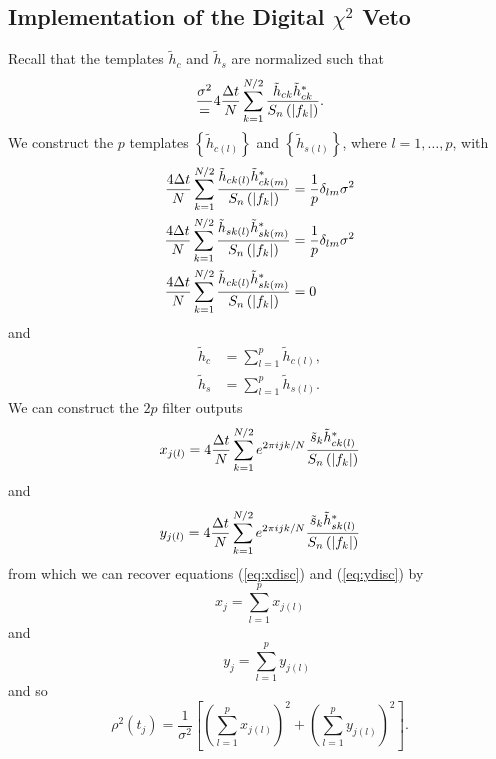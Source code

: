 \subsection{Implementation of the Digital $\chi^2$ Veto}
\label{ss:chisqdisc}

Recall that the templates $\tilde{h}_c$ and $\tilde{h}_s$ are normalized such
that
\begin{equation}
\frac{\sigma^2} = 4 \frac{\Delta t}{N} \sum_{k=1}^{N/2}
\frac{\tilde{h}_{ck} \tilde{h}_{ck}^\ast } {S_n\left(\left|f_{k}\right|\right)}.
\end{equation}
We construct the $p$ templates $\left\{ \tilde{h}_{c(l)} \right\}$ and 
$\left\{ \tilde{h}_{s(l)} \right\}$, where $l = 1,\ldots,p$, with
\begin{align}
\frac{4\Delta t}{N} \sum_{k=1}^{N/2} 
\frac{\tilde{h}_{ck(l)} \tilde{h}_{ck(m)}^\ast}{S_n\left(\left|f_{k}\right|\right)} &= \frac{1}{p}\delta_{lm}\sigma^2 \\
\frac{4\Delta t}{N} \sum_{k=1}^{N/2} 
\frac{\tilde{h}_{sk(l)} \tilde{h}_{sk(m)}^\ast}{S_n\left(\left|f_{k}\right|\right)} &= \frac{1}{p}\delta_{lm}\sigma^2 \\
\frac{4\Delta t}{N} \sum_{k=1}^{N/2} 
\frac{\tilde{h}_{ck(l)} \tilde{h}_{sk(m)}^\ast}{S_n\left(\left|f_{k}\right|\right)} &= 0
\end{align}
and
\begin{align}
\tilde{h}_{c} &= \sum_{l=1}^{p} \tilde{h}_{c(l)}, \\
\tilde{h}_{s} &= \sum_{l=1}^{p} \tilde{h}_{s(l)}.
\end{align}
We can construct the $2p$ filter outputs
\begin{equation}
x_{j(l)} = 4 \frac{\Delta t}{N} 
   \sum_{k=1}^{N/2} e^{2\pi ijk/N} 
   \frac{\tilde{s}_k \tilde{h}_{ck(l)}^\ast}
        {S_n\left(\left|f_{k}\right|\right)}
\end{equation}
and
\begin{equation}
y_{j(l)} = 4 \frac{\Delta t}{N} 
   \sum_{k=1}^{N/2} e^{2\pi ijk/N} 
   \frac{\tilde{s}_k \tilde{h}_{sk(l)}^\ast}
        {S_n\left(\left|f_{k}\right|\right)}
\end{equation}
from which we can recover equations (\ref{eq:xdisc}) and (\ref{eq:ydisc}) by
\begin{equation}
x_j = \sum_{l = 1}^{p} x_{j(l)}
\end{equation}
and
\begin{equation}
\quad y_j = \sum_{l = 1}^{p} y_{j(l)}
\end{equation}
and so 
\begin{equation}
\rho^2(t_j) = \frac{1}{\sigma^2} \left[ \left( \sum_{l = 1}^{p} x_{j(l)} \right)^2 + \left( \sum_{l = 1}^{p} y_{j(l)} \right )^2 \right].
\end{equation}

